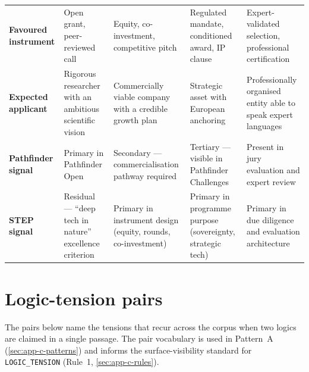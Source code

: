 \begin{longtable}{@{} p{2.4cm} p{2.6cm} p{2.6cm} p{2.6cm} p{2.6cm} @{}}
\addlinespace
{\footnotesize\textbf{Favoured instrument}} & {\footnotesize Open grant, peer-reviewed call} & {\footnotesize Equity, co-investment, competitive pitch} & {\footnotesize Regulated mandate, conditioned award, IP clause} & {\footnotesize Expert-validated selection, professional certification} \\
\addlinespace
{\footnotesize\textbf{Expected applicant}} & {\footnotesize Rigorous researcher with an ambitious scientific vision} & {\footnotesize Commercially viable company with a credible growth plan} & {\footnotesize Strategic asset with European anchoring} & {\footnotesize Professionally organised entity able to speak expert languages} \\
\addlinespace
{\footnotesize\textbf{Pathfinder signal}} & {\footnotesize Primary in Pathfinder Open} & {\footnotesize Secondary --- commercialisation pathway required} & {\footnotesize Tertiary --- visible in Pathfinder Challenges} & {\footnotesize Present in jury evaluation and expert review} \\
\addlinespace
{\footnotesize\textbf{STEP signal}} & {\footnotesize Residual --- \enquote{deep tech in nature} excellence criterion} & {\footnotesize Primary in instrument design (equity, rounds, co-investment)} & {\footnotesize Primary in programme purpose (sovereignty, strategic tech)} & {\footnotesize Primary in due diligence and evaluation architecture} \\
\end{longtable}

\section*{Logic-tension pairs}

The pairs below name the tensions that recur across the corpus when
two logics are claimed in a single passage. The pair vocabulary is
used in Pattern~A (\cref{sec:app-c-patterns}) and informs the
surface-visibility standard for \texttt{LOGIC\_TENSION} (Rule~1,
\cref{sec:app-c-rules}).

